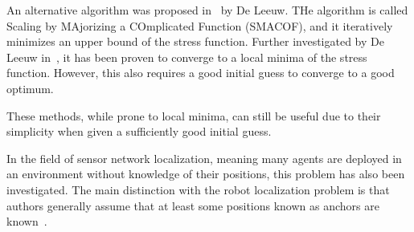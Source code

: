 An alternative algorithm was proposed in~\cite{MDS_proposal} by De Leeuw. THe algorithm is called Scaling by MAjorizing a COmplicated Function (SMACOF), and it iteratively minimizes an upper bound of the stress function. Further investigated by De Leeuw in~\cite{SMACOF_convergence}, it has been proven to converge to a local minima of the stress function. However, this also requires a good initial guess to converge to a good optimum. 

These methods, while prone to local minima, can still be useful due to their simplicity when given a sufficiently good initial guess. 

In the field of sensor network localization, meaning many agents are deployed in an environment without knowledge of their positions, this problem has also been investigated. The main distinction with the robot localization problem is that authors generally assume that at least some positions known as anchors are known~\cite{WSN_collaborative,WSN_localization_techniques,optimization_WSN,WSN_stochastic}. 



